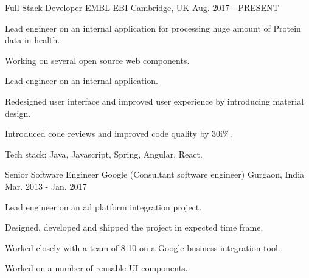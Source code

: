 

\begin{cventries}

  \cventry
    {Full Stack Developer} %
    {EMBL-EBI} %
    {Cambridge, UK} %
    {Aug. 2017 - PRESENT} %
    {
      \begin{cvitems} %
        \item {Lead engineer on an internal application for processing huge amount of Protein data in health.}
        \item {Working on several open source web components.}
        \item {Lead engineer on an internal application.}
        \item {Redesigned user interface and improved user experience by introducing material design.}
        \item {Introduced code reviews and improved code quality by 30i\%.}
        \item {Tech stack: Java, Javascript, Spring, Angular, React.}
      \end{cvitems}
    }

  \cventry
    {Senior Software Engineer} %
    {Google (Consultant software engineer)} %
    {Gurgaon, India} %
    {Mar. 2013 - Jan. 2017} %
    {
      \begin{cvitems} %
        \item {Lead engineer on an ad platform integration project.}
        \item {Designed, developed and shipped the project in expected time frame.}
        \item {Worked closely with a team of 8-10 on a Google business integration tool.}
        \item {Worked on a number of reusable UI components.}
      \end{cvitems}
    }


\end{cventries}
